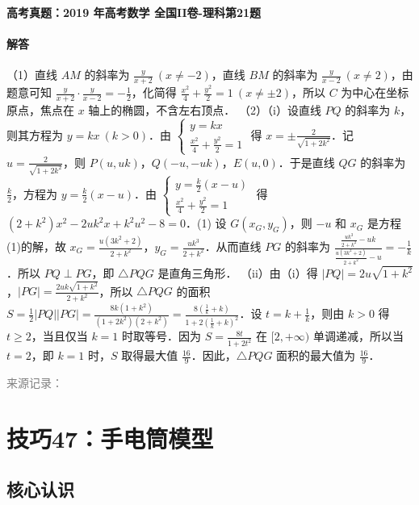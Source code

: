 \documentclass[UTF8,a4paper,11pt]{ctexart}
\newenvironment{gaokao}[1]{\par\medskip\noindent\textbf{高考真题：#1}\par\smallskip}{\par\medskip}
\begin{document}
\begin{gaokao}{2019 年高考数学 全国II卷-理科第21题}
\paragraph{解答}

（1）直线 $AM$ 的斜率为 $\frac{y}{x+2}\ (x\neq -2)$，直线 $BM$ 的斜率为 $\frac{y}{x-2}\ (x\neq 2)$，由题意可知 $\frac{y}{x+2}\cdot\frac{y}{x-2}=-\frac{1}{2}$，化简得 $\frac{x^2}{4}+\frac{y^2}{2}=1\ (x\neq\pm 2)$，所以 $C$ 为中心在坐标原点，焦点在 $x$ 轴上的椭圆，不含左右顶点．
（2）（i）设直线 $PQ$ 的斜率为 $k$，则其方程为 $y=kx\ (k>0)$．由 $\begin{cases} y=kx \\ \frac{x^2}{4}+\frac{y^2}{2}=1 \end{cases}$ 得 $x=\pm\frac{2}{\sqrt{1+2k^2}}$．记 $u=\frac{2}{\sqrt{1+2k^2}}$，则 $P(u,uk)$，$Q(-u,-uk)$，$E(u,0)$．于是直线 $QG$ 的斜率为 $\frac{k}{2}$，方程为 $y=\frac{k}{2}(x-u)$．由 $\begin{cases} y=\frac{k}{2}(x-u) \\ \frac{x^2}{4}+\frac{y^2}{2}=1 \end{cases}$ 得 $(2+k^2)x^2-2uk^2x+k^2u^2-8=0$．(1) 设 $G(x_G,y_G)$，则 $-u$ 和 $x_G$ 是方程(1)的解，故 $x_G=\frac{u(3k^2+2)}{2+k^2}$，$y_G=\frac{uk^3}{2+k^2}$．从而直线 $PG$ 的斜率为 $\frac{\frac{uk^3}{2+k^2}-uk}{\frac{u(3k^2+2)}{2+k^2}-u}=-\frac{1}{k}$．所以 $PQ\perp PG$，即 $\triangle PQG$ 是直角三角形．
（ii）由（i）得 $|PQ|=2u\sqrt{1+k^2}$，$|PG|=\frac{2uk\sqrt{1+k^2}}{2+k^2}$，所以 $\triangle PQG$ 的面积 $S=\frac{1}{2}|PQ||PG|=\frac{8k(1+k^2)}{(1+2k^2)(2+k^2)}=\frac{8(\frac{1}{k}+k)}{1+2(\frac{1}{k}+k)^2}$．设 $t=k+\frac{1}{k}$，则由 $k>0$ 得 $t\geq 2$，当且仅当 $k=1$ 时取等号．因为 $S=\frac{8t}{1+2t^2}$ 在 $[2,+\infty)$ 单调递减，所以当 $t=2$，即 $k=1$ 时，$S$ 取得最大值 $\frac{16}{9}$．因此，$\triangle PQG$ 面积的最大值为 $\frac{16}{9}$．

\par\smallskip\textcolor{gray}{\footnotesize 来源记录：\texttt{}}

\end{gaokao}

\clearpage

\section{技巧47：手电筒模型}

\subsection*{核心认识}
\end{document}
